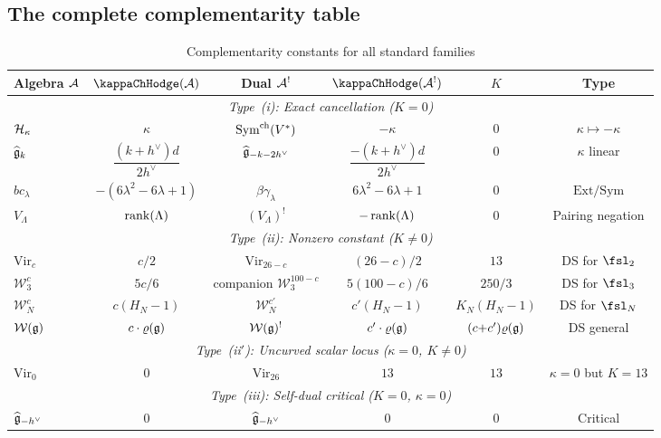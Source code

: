 %
%

\subsection{The complete complementarity table}

\begin{table}[ht]
\centering
\caption{Complementarity constants for all standard families}
\renewcommand{\arraystretch}{1.6}
{\small
\begin{tabular}{|l|c|c|c|c|c|}
\hline
\textbf{Algebra $\mathcal{A}$} & $\kappaChHodge(\cA)$ & \textbf{Dual $\mathcal{A}^!$} &
$\kappaChHodge(\cA^!)$ & $K$ & \textbf{Type} \\
\hline
\multicolumn{6}{|c|}{\textit{Type~(i): Exact cancellation ($K = 0$)}} \\
\hline
$\mathcal{H}_\kappa$ & $\kappa$ & $\operatorname{Sym}^{\mathrm{ch}}(V^*)$ & $-\kappa$ & $0$ &
$\kappa \mapsto -\kappa$ \\
\hline
$\widehat{\mathfrak{g}}_k$ &
$\dfrac{(k+h^\vee)d}{2h^\vee}$ &
$\widehat{\mathfrak{g}}_{-k-2h^\vee}$ &
$\dfrac{-(k+h^\vee)d}{2h^\vee}$ & $0$ & $\kappa$ linear \\
\hline
$bc_\lambda$ & $-(6\lambda^2 - 6\lambda + 1)$ &
$\beta\gamma_\lambda$ & $6\lambda^2 - 6\lambda + 1$ & $0$ &
$\mathrm{Ext}/\mathrm{Sym}$ \\
\hline
$V_\Lambda$ & $\operatorname{rank}(\Lambda)$ &
$(V_\Lambda)^!$ & $-\operatorname{rank}(\Lambda)$ & $0$ & Pairing negation \\
\hline
\multicolumn{6}{|c|}{\textit{Type~(ii): Nonzero constant ($K \neq 0$)}} \\
\hline
$\mathrm{Vir}_c$ & $c/2$ & $\mathrm{Vir}_{26-c}$ &
$(26{-}c)/2$ & $13$ & DS for $\fsl_2$ \\
\hline
$\mathcal{W}_3^c$ & $5c/6$ & companion $\mathcal{W}_3^{100-c}$ &
$5(100{-}c)/6$ & $250/3$ & DS for $\fsl_3$ \\
\hline
$\mathcal{W}_N^c$ & $c(H_N{-}1)$ & $\mathcal{W}_N^{c'}$ &
$c'(H_N{-}1)$ & $K_N(H_N{-}1)$ & DS for $\fsl_N$ \\
\hline
$\mathcal{W}(\mathfrak{g})$ & $c \cdot \varrho(\mathfrak{g})$ &
$\mathcal{W}(\mathfrak{g})^!$ & $c' \cdot \varrho(\mathfrak{g})$ &
$(c{+}c')\varrho(\mathfrak{g})$ & DS general \\
\hline
\multicolumn{6}{|c|}{\textit{Type~(ii$'$): Uncurved scalar locus ($\kappa = 0$, $K \neq 0$)}} \\
\hline
$\mathrm{Vir}_0$ & $0$ & $\mathrm{Vir}_{26}$ & $13$ & $13$ & $\kappa = 0$ but $K = 13$ \\
\hline
\multicolumn{6}{|c|}{\textit{Type~(iii): Self-dual critical ($K = 0$, $\kappa = 0$)}} \\
\hline
$\widehat{\mathfrak{g}}_{-h^\vee}$ & $0$ & $\widehat{\mathfrak{g}}_{-h^\vee}$ & $0$ &
$0$ & Critical \\
\hline
\end{tabular}
}
\end{table}

